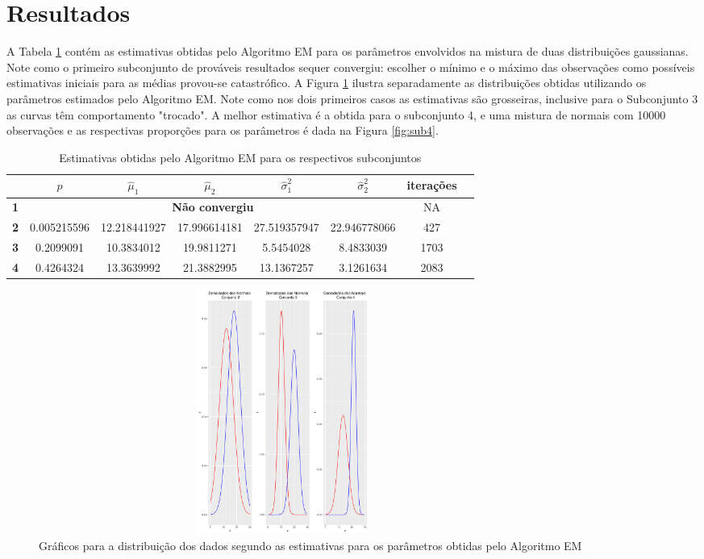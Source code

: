 \documentclass[
	article,			%
	11pt,				%
	oneside,			%
	a4paper,			%
	english,			%
	brazil,				%
	sumario=tradicional
	]{abntex2}
\begin{document}
\section{Resultados}
\label{sec:resultados}
A Tabela \ref{tab:3} contém as estimativas obtidas pelo Algoritmo EM para os parâmetros envolvidos na mistura de duas distribuições gaussianas. Note como o primeiro subconjunto de prováveis resultados sequer convergiu: escolher o mínimo e o máximo das observações como possíveis estimativas iniciais para as médias provou-se catastrófico. A Figura \ref{fig:estimativas} ilustra separadamente as distribuições obtidas utilizando os parâmetros estimados pelo Algoritmo EM. Note como nos dois primeiros casos as estimativas são grosseiras, inclusive para o Subconjunto 3 as curvas têm comportamento "trocado". A melhor estimativa é a obtida para o subconjunto 4, e uma mistura de normais com 10000 observações e as respectivas proporções para os parâmetros é dada na Figura \ref{fig:sub4}.

\begin{table}[H]
	\centering
	\begin{tabular}{c|ccccccc}
   	 & $\hat{p}$ & $\hat{\mu}_1$ & $\hat{\mu}_2$ & $\hat{\sigma}_1^2$ & $\hat{\sigma}_2^2$ & iterações \\\hline
    \textbf{1} & \multicolumn{5}{c}{\textbf{Não convergiu}} & NA\\
    \textbf{2} & 0.005215596 & 12.218441927 & 17.996614181 & 27.519357947 & 22.946778066 & 427 \\
    \textbf{3} & 0.2099091 & 10.3834012 & 19.9811271 & 5.5454028 & 8.4833039 & 1703\\
    \textbf{4} & 0.4264324 & 13.3639992 & 21.3882995 & 13.1367257 & 3.1261634 & 2083
  	\end{tabular}
    \caption{Estimativas obtidas pelo Algoritmo EM para os respectivos subconjuntos}
    \label{tab:3}
\end{table}

\begin{figure}[H]
\centering
\includegraphics[height = 8cm, width = 16cm]{estimativas}
\caption{Gráficos para a distribuição dos dados segundo as estimativas para os parâmetros obtidas pelo Algoritmo EM}
\label{fig:estimativas}
\end{figure}
\end{document}
